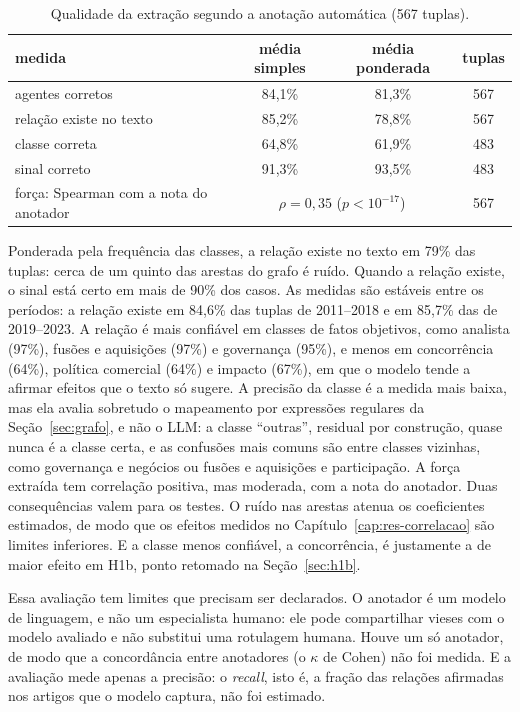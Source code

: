 \begin{table}[htbp]
\centering
\small
\caption{Qualidade da extração segundo a anotação automática (567 tuplas).}
\label{tab:anotacao}
\begin{tabular}{lccc}
\toprule
medida & média simples & média ponderada & tuplas \\
\midrule
agentes corretos & 84,1\% & 81,3\% & 567 \\
relação existe no texto & 85,2\% & 78,8\% & 567 \\
classe correta & 64,8\% & 61,9\% & 483 \\
sinal correto & 91,3\% & 93,5\% & 483 \\
\midrule
força: Spearman com a nota do anotador & \multicolumn{2}{c}{$\rho=0{,}35$ ($p<10^{-17}$)} & 567 \\
\bottomrule
\end{tabular}
\end{table}

Ponderada pela frequência das classes, a relação existe no texto em 79\% das tuplas: cerca de um quinto
das arestas do grafo é ruído. Quando a relação existe, o sinal está certo em mais de 90\% dos casos. As medidas são estáveis entre os períodos: a relação
existe em 84,6\% das tuplas de 2011--2018 e em 85,7\% das de 2019--2023. A relação é mais confiável em
classes de fatos objetivos, como analista (97\%), fusões e aquisições (97\%) e governança (95\%), e menos em
concorrência (64\%), política comercial (64\%) e impacto (67\%), em que o modelo tende a afirmar efeitos
que o texto só sugere. A precisão da classe é a medida mais baixa, mas ela avalia sobretudo o mapeamento por
expressões regulares da Seção~\ref{sec:grafo}, e não o LLM: a classe ``outras'', residual por construção,
quase nunca é a classe certa, e as confusões mais comuns são entre classes vizinhas, como governança e
negócios ou fusões e aquisições e participação. A força extraída tem correlação positiva, mas moderada, com
a nota do anotador. Duas consequências valem para os testes. O ruído nas arestas atenua os coeficientes
estimados, de modo que os efeitos medidos no Capítulo~\ref{cap:res-correlacao} são limites inferiores. E a
classe menos confiável, a concorrência, é justamente a de maior efeito em H1b, ponto retomado na
Seção~\ref{sec:h1b}.

Essa avaliação tem limites que precisam ser declarados. O anotador é um modelo de linguagem, e não um
especialista humano: ele pode compartilhar vieses com o modelo avaliado e não substitui uma rotulagem
humana. Houve um só anotador, de modo que a concordância entre anotadores (o $\kappa$ de Cohen) não foi
medida. E a avaliação mede apenas a precisão: o \emph{recall}, isto é, a fração das relações afirmadas nos
artigos que o modelo captura, não foi estimado.

